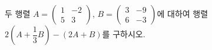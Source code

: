 두 행렬 $A=\begin{pmatrix} 1 & -2 \\ 5 & 3 \end{pmatrix}$, $B=\begin{pmatrix} 3 & -9 \\ 6 & -3 \end{pmatrix}$에 대하여 행렬 $2\left(A+\dfrac{1}{3}B\right)-(2A+B)$를 구하시오.
